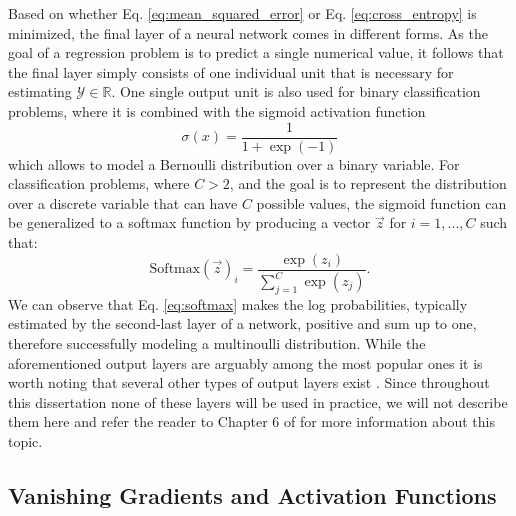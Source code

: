 Based on whether Eq. \ref{eq:mean_squared_error} or Eq. \ref{eq:cross_entropy} is minimized, the final layer of a neural network comes in different forms. As the goal of a regression problem is to predict a single numerical value, it follows that the final layer simply consists of one individual unit that is necessary for estimating $\mathcal{Y}\in\mathds{R}$. One single output unit is also used for binary classification problems, where it is combined with the sigmoid activation function
\begin{equation}
	\sigma(x) = \frac{1}{1+\exp(-1)}
	\label{eq:sigmoid}
\end{equation}
which allows to model a Bernoulli distribution over a binary variable. For classification problems, where $C>2$, and the goal is to represent the distribution over a discrete variable that can have $C$ possible values, the sigmoid function can be generalized to a softmax function by producing a vector $\vec{z}$ for $i=1,...,C$ such that:
\begin{equation}
	\text{Softmax}(\vec{z})_i = \frac{\exp(z_i)}{\sum_{j=1}^{C} \exp(z_j)}.
	\label{eq:softmax}
\end{equation}
We can observe that Eq. \ref{eq:softmax} makes the log probabilities, typically estimated by the second-last layer of a network, positive and sum up to one, therefore successfully modeling a multinoulli distribution. While the aforementioned output layers are arguably among the most popular ones it is worth noting that several other types of output layers exist \cite{goodfellow2013maxout,graves2006connectionist}. Since throughout this dissertation none of these layers will be used in practice, we will not describe them here and refer the reader to Chapter 6 of \cite{goodfellow2016deep} for more information about this topic.

\subsection{Vanishing Gradients and Activation Functions}
\label{sec:activation_functions}


